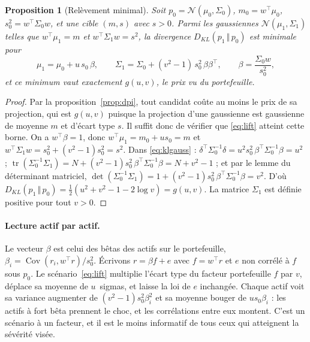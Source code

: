 \documentclass[11pt]{article}
\newtheorem{proposition}{Proposition}
\theoremstyle{definition}
\theoremstyle{remark}
\newcommand{\KL}[2]{D_{KL}\!\left(#1\,\Vert\,#2\right)}
\begin{document}
\begin{proposition}[Relèvement minimal]
\label{prop:lift}
Soit $p_0=\mathcal N(\mu_0,\Sigma_0)$, $m_0=w^\top\mu_0$, $s_0^2=w^\top\Sigma_0w$,
et une cible $(m,s)$ avec $s>0$. Parmi les gaussiennes
$\mathcal N(\mu_1,\Sigma_1)$ telles que $w^\top\mu_1=m$ et
$w^\top\Sigma_1w=s^2$, la divergence $\KL{p_1}{p_0}$ est minimale pour
\begin{equation}
\label{eq:lift}
\mu_1=\mu_0+u\,s_0\,\beta,\qquad
\Sigma_1=\Sigma_0+(v^2-1)\,s_0^2\,\beta\beta^\top,
\qquad\beta=\frac{\Sigma_0w}{s_0^2},
\end{equation}
et ce minimum vaut exactement $g(u,v)$, le prix vu du portefeuille.
\end{proposition}

\begin{proof}
Par la proposition~\ref{prop:dpi}, tout candidat coûte au moins le prix de sa
projection, qui est $g(u,v)$ puisque la projection d'une gaussienne est
gaussienne de moyenne $m$ et d'écart type $s$. Il suffit donc de vérifier que
\eqref{eq:lift} atteint cette borne. On a $w^\top\beta=1$, donc
$w^\top\mu_1=m_0+us_0=m$ et $w^\top\Sigma_1w=s_0^2+(v^2-1)s_0^2=s^2$. Dans
\eqref{eq:klgauss} : $\delta^\top\Sigma_0^{-1}\delta=u^2s_0^2\,\beta^\top\Sigma_0^{-1}\beta=u^2$ ;
$\operatorname{tr}(\Sigma_0^{-1}\Sigma_1)=N+(v^2-1)s_0^2\,\beta^\top\Sigma_0^{-1}\beta=N+v^2-1$ ;
et par le lemme du déterminant matriciel,
$\det(\Sigma_0^{-1}\Sigma_1)=1+(v^2-1)s_0^2\,\beta^\top\Sigma_0^{-1}\beta=v^2$.
D'où $\KL{p_1}{p_0}=\tfrac12(u^2+v^2-1-2\log v)=g(u,v)$. La matrice $\Sigma_1$ est
définie positive pour tout $v>0$.
\end{proof}

\paragraph{Lecture actif par actif.} Le vecteur $\beta$ est celui des bêtas des
actifs sur le portefeuille, $\beta_i=\operatorname{Cov}(r_i,w^\top r)/s_0^2$.
Écrivons $r=\beta f+e$ avec $f=w^\top r$ et $e$ non corrélé à $f$ sous $p_0$.
Le scénario~\eqref{eq:lift} multiplie l'écart type du facteur portefeuille $f$
par $v$, déplace sa moyenne de $u$~sigmas, et laisse la loi de $e$ inchangée.
Chaque actif voit sa variance augmenter de $(v^2-1)s_0^2\beta_i^2$ et sa
moyenne bouger de $us_0\beta_i$ : les actifs à fort bêta prennent le choc, et
les corrélations entre eux montent. C'est un scénario à un facteur, et il est
le moins informatif de tous ceux qui atteignent la sévérité visée.
\end{document}
